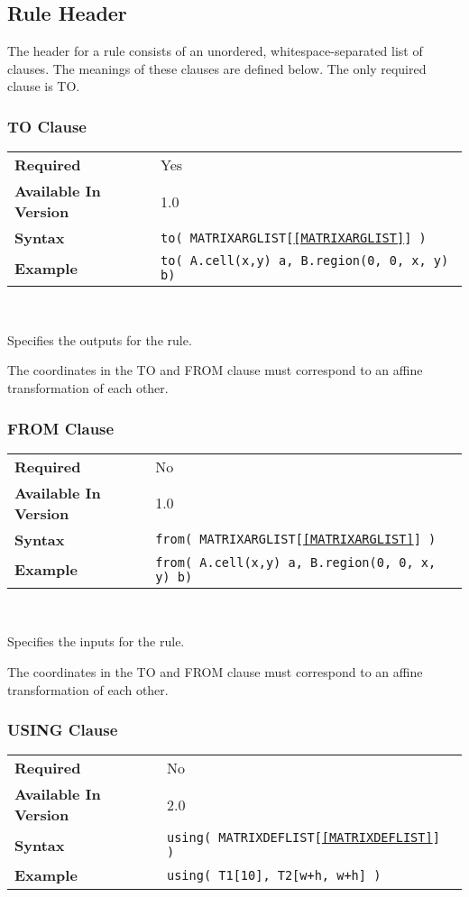\documentclass[11pt]{article}
\begin{document}
\subsection{Rule Header}
\label{sec:rule}

The header for a rule consists of an unordered, whitespace-separated list
of clauses.  The meanings of these clauses are defined below.  The only
required clause is TO.

\subsubsection{TO Clause}
\label{TO}
\begin{tabular}{| l | l |}
\hline
\bf Required & Yes                          \\
\bf Available In Version & 1.0             \\
\bf Syntax & \tt to( MATRIXARGLIST[\ref{MATRIXARGLIST}] ) \\
\bf Example & \tt to( A.cell(x,y) a, B.region(0, 0, x, y) b)\\
\hline
\end{tabular}

~

\noindent Specifies the outputs for the rule.

The coordinates in the TO and FROM clause must correspond to an affine
transformation of each other.

\subsubsection{FROM Clause}
\label{FROM}
\begin{tabular}{| l | l |}
\hline
\bf Required & No                          \\
\bf Available In Version & 1.0             \\
\bf Syntax & \tt from( MATRIXARGLIST[\ref{MATRIXARGLIST}] ) \\
\bf Example & \tt from( A.cell(x,y) a, B.region(0, 0, x, y) b)\\
\hline
\end{tabular}

~

\noindent Specifies the inputs for the rule.

The coordinates in the TO and FROM clause must correspond to an affine
transformation of each other.

\subsubsection{USING Clause}
\label{USING}
\begin{tabular}{| l | l |}
\hline
\bf Required & No \\
\bf Available In Version & 2.0             \\
\bf Syntax & \tt using( MATRIXDEFLIST[\ref{MATRIXDEFLIST}] ) \\
\bf Example & \tt using( T1[10], T2[w+h, w+h] ) \\
\hline
\end{tabular}
\end{document}
